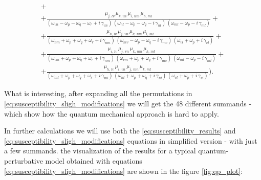 \documentclass[12pt,twoside,a4paper]{article}
\numberwithin{equation}{subsection}
\numberwithin{figure}{subsection}
\begin{document}
\begin{subequations}
\begin{alignat*}{1}
+\\ +\frac {{\mu_{j,\,lv}}\,{\mu_{k,\,vn}}\,{\mu_{i,\,nm}}\,{\mu_{h,\,ml}}}
     {({\omega_{vn}} - {\omega_{p}} - {\omega_{q}} - {\omega_{r}} + i\,{\gamma_{vn}})\,
      ({\omega_{nl}} - {\omega_{p}} - {\omega_{q}} - i\,{\gamma_{nl}})\,
      ({\omega_{ml}} - {\omega_{p}} - i\,{\gamma_{ml}})} 
+\\ +\frac {{\mu_{h,\,lv}}\,{\mu_{j,\,vn}}\,{\mu_{k,\,nm}}\,{\mu_{i,\,ml}}}
     {({\omega_{nm}} + {\omega_{p}} + {\omega_{q}} + {\omega_{r}} + i\,{\gamma_{nm}})\,
      ({\omega_{mv}} - {\omega_{p}} - {\omega_{q}} - i\,{\gamma_{mv}})\,
      ({\omega_{vl}} + {\omega_{p}} + i\,{\gamma_{vl}})} 
+\\ +\frac {{\mu_{i,\,lv}}\,{\mu_{j,\,vn}}\,{\mu_{k,\,nm}}\,{\mu_{h,\,ml}}}
     {({\omega_{vm}} + {\omega_{p}} + {\omega_{q}} + {\omega_{r}} + i\,{\gamma_{nm}})\,
      ({\omega_{vm}} + {\omega_{p}} + {\omega_{q}} + i\,{\gamma_{mv}})\,
      ({\omega_{ml}} - {\omega_{p}} - i\,{\gamma_{ml}})} 
+\\ +\frac {{\mu_{h, \,lv}}\,{\mu_{i,\,vn}}\,{\mu_{j,\,mn}}\,{\mu_{k,\,ml}}}
     {({\omega_{ml}} + {\omega_{p}} + {\omega_{q}} + {\omega_{r}} + i\,{\gamma_{ml}})\,
      ({\omega_{nl}} + {\omega_{p}} + {\omega_{q}} + i\,{\gamma_{nl}})\,
      ({\omega_{vl}} + {\omega_{p}} + i\,{\gamma_{vl}})}).
  \end{alignat*}
\end{subequations}

What is interesting, after expanding all the permutations in \ref{eq:susceptibility_sligh_modifications} we will get the 48 different
summands - which show how the quantum mechanical approach is hard to apply.

In further calculations we will use both the \ref{eq:susceptibility_results} and \ref{eq:susceptibility_sligh_modifications}
equations in simplified version - with just a few summands. the visualization of the results for a typical quantum-perturbative model
obtained with equations \ref{eq:susceptibility_sligh_modifications} are shown in the figure \ref{fig:qp_plot}:
\end{document}
